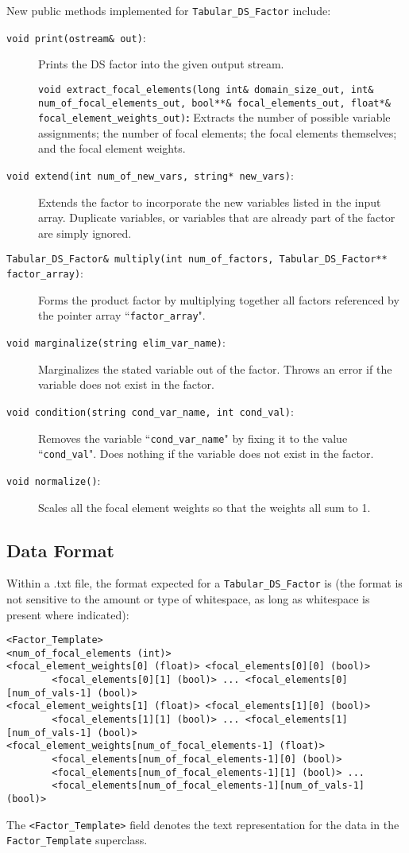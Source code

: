 \documentclass{article}
\begin{document}
New public methods implemented for \texttt{Tabular\_DS\_Factor} include:

\begin{description}
\item[\texttt{void print(ostream\& out)}:] Prints the DS factor into the given output stream.
\item[]\texttt{void extract\_focal\_elements(long int\& domain\_size\_out, int\& num\_of\_focal\_elements\_out, bool**\& focal\_elements\_out, float*\& focal\_element\_weights\_out)}\textbf{:} Extracts the number of possible variable assignments; the number of focal elements; the focal elements themselves; and the focal element weights.
\item[\texttt{void extend(int num\_of\_new\_vars, string* new\_vars)}:] Extends the factor to incorporate the new variables listed in the input array. Duplicate variables, or variables that are already part of the factor are simply ignored.
\item[\texttt{Tabular\_DS\_Factor\& multiply(int num\_of\_factors, Tabular\_DS\_Factor** factor\_array)}:] Forms the product factor by multiplying together all factors referenced by the pointer array ``\texttt{factor\_array}".   
\item[\texttt{void marginalize(string elim\_var\_name)}:] Marginalizes the stated variable out of the factor. Throws an error if the variable does not exist in the factor.
\item[\texttt{void condition(string cond\_var\_name, int cond\_val)}:] Removes the variable ``\texttt{cond\_var\_name}" by fixing it to the value ``\texttt{cond\_val}". Does nothing if the variable does not exist in the factor.
\item[\texttt{void normalize()}:] Scales all the focal element weights so that the weights all sum to 1.
\end{description}

\subsection{Data Format}

Within a .txt file, the format expected for a \texttt{Tabular\_DS\_Factor} is (the format is not sensitive to the amount or type of whitespace, as long as whitespace is present where indicated):
\begin{verbatim}
<Factor_Template>
<num_of_focal_elements (int)>
<focal_element_weights[0] (float)> <focal_elements[0][0] (bool)> 
        <focal_elements[0][1] (bool)> ... <focal_elements[0][num_of_vals-1] (bool)>
<focal_element_weights[1] (float)> <focal_elements[1][0] (bool)> 
        <focal_elements[1][1] (bool)> ... <focal_elements[1][num_of_vals-1] (bool)>
<focal_element_weights[num_of_focal_elements-1] (float)> 
        <focal_elements[num_of_focal_elements-1][0] (bool)> 
        <focal_elements[num_of_focal_elements-1][1] (bool)> ... 
        <focal_elements[num_of_focal_elements-1][num_of_vals-1] (bool)>
\end{verbatim}
The \texttt{<Factor\_Template>} field denotes the text representation for the data in the \texttt{Factor\_Template} superclass.
\end{document}
